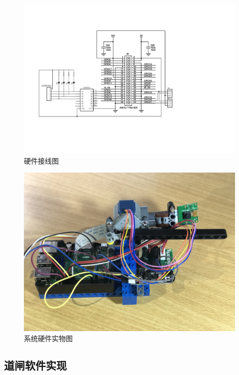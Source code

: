 \documentclass[a4paper]{ctexart}
\begin{document}
\begin{figure}[htbp]
	\centering
	\includegraphics[width=\textwidth]{figure/archive-pin.pdf}
	\caption{硬件接线图}\label{fig:硬件接线图}
\end{figure}

\begin{figure}[htbp]
	\centering
	\includegraphics[width=\textwidth]{figure/archive.JPG}
	\caption{系统硬件实物图}\label{fig:系统硬件实物图}
\end{figure}

\subsection{道闸软件实现}

\end{document}
